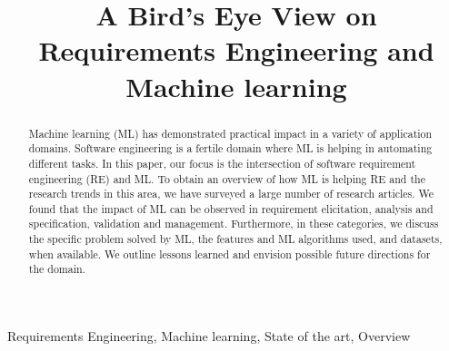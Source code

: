 \documentclass[conference]{IEEEtran}
\begin{document}
\title{A Bird’s Eye View on Requirements Engineering and Machine learning} 

\author{
\and
{} 
\and
{}
}   
\maketitle

\begin{abstract}
Machine learning (ML) has demonstrated practical impact in a variety of application domains. Software engineering is a fertile domain where ML is helping in automating  different tasks. In this paper, our focus is the intersection of software requirement engineering (RE) and ML.  To obtain an overview of how ML is helping RE and the research trends in this area, we have surveyed a large number of research articles. We found that the impact of ML can be observed in requirement elicitation, analysis and specification, validation and management. Furthermore, in these categories, we discuss the specific problem solved by ML, the features and ML algorithms used, and datasets, when available. We outline lessons learned and envision possible future directions for the domain.
\end{abstract}

\begin{IEEEkeywords}
Requirements Engineering, Machine learning, State of the art, Overview
\end{IEEEkeywords}
  
 
 
   
 
  
 
  
\end{document}
